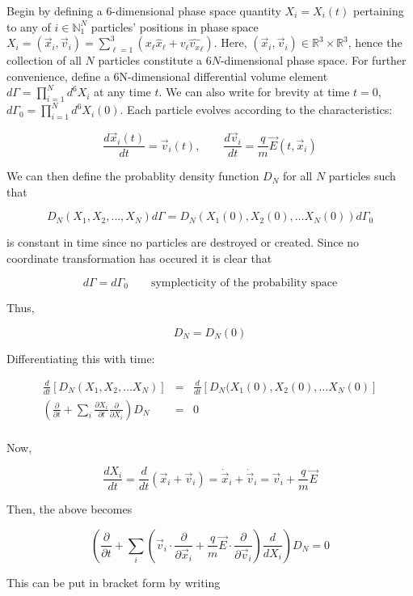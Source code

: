 Begin by defining a 6-dimensional phase space quantity $X_i = X_i(t)$ pertaining to any of $i\in\mathbb{N}_1^N$ particles' positions in phase space $X_i = (\vec{x}_i, \vec{v}_i)= \sum_{\ell = 1}^3 (x_{\ell} \hat{x}_{\ell} + v_{\ell} \hat{v_x}_{\ell})$. Here, $(\vec{x}_i, \vec{v}_i)\in\mathbb{R}^3\times\mathbb{R}^3$, hence the collection of all $N$ particles constitute a $6N$-dimensional phase space. For further convenience, define a 6N-dimensional differential volume element  $d\Gamma = \prod_{i=1}^N d^6X_i$ at any time $t$. We can also write for brevity at time $t = 0$, $d\Gamma_0 = \prod_{i=1}^N d^6X_i(0)$. Each particle evolves according to the characteristics:

$$\frac{d\vec{x}_i(t)}{dt} = \vec{v}_i (t), \qquad \frac{d\vec{v}_i}{dt} = \frac{q}{m}\vec{E}(t,\vec{x}_i)$$

We can then define the probablity density function $D_N$ for all $N$ particles such that 

$$D_N(X_1, X_2, \ldots , X_N)d\Gamma = D_N(X_1(0), X_2(0), \ldots X_N(0)) d\Gamma_0$$

is constant in time since no particles are destroyed or created. Since no coordinate transformation has occured it is clear that

$$d\Gamma = d\Gamma_0 \qquad \text{symplecticity of the probability space}$$

Thus, 

$$D_N = D_N(0)$$

Differentiating this with time:

\begin{eqnarray*}
\frac{d}{dt}\left[D_N(X_1, X_2, \ldots X_N)\right] & = & \frac{d}{dt}\left[D_N(X_1(0), X_2(0), \ldots X_N(0)\right]\\
\left(\frac{\partial}{\partial t} + \sum_i \frac{\partial X_i}{\partial t}\frac{\partial }{\partial X_i}\right) D_N & = & 0 \\
\end{eqnarray*}

Now,

$$\frac{dX_i}{dt} = \frac{d}{dt}(\vec{x}_i + \vec{v}_i) = \dot{\vec{x}}_i + \dot{\vec{v}}_i = \vec{v}_i + \frac{q}{m}\vec{E}$$

Then, the above becomes

$$\left(\frac{\partial}{\partial t} + \sum_i \left(\vec{v}_i\cdot\frac{\partial}{\partial\vec{x}_i}  + \frac{q}{m}\vec{E}\cdot \frac{\partial}{\partial\vec{v}_i}\right)\frac{d}{dX_i}\right) D_N  =  0$$


This can be put in bracket form by writing 

